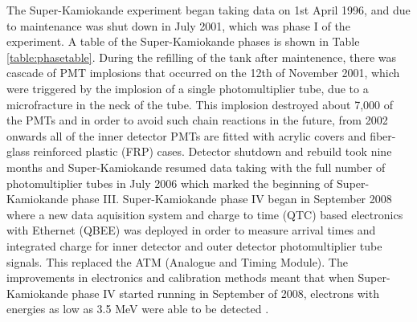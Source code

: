 The Super-Kamiokande experiment began taking data on 1st April 1996, and due to maintenance was shut down in July 2001, which was phase I of the experiment. A table of the Super-Kamiokande phases is shown in Table \ref{table:phasetable}. During the refilling of the tank after maintenence, there was cascade of PMT implosions that occurred on the 12th of November 2001, which were triggered by the implosion of a single photomultiplier tube, due to a microfracture in the neck of the tube. This implosion destroyed about 7,000 of the PMTs and in order to avoid such chain reactions in the future, from 2002 onwards all of the inner detector PMTs are fitted with acrylic covers and fiber-glass reinforced plastic (FRP) cases. Detector shutdown and rebuild took nine months and Super-Kamiokande resumed data taking with the full number of photomultiplier tubes in July 2006 which marked the beginning of Super-Kamiokande phase III. Super-Kamiokande phase IV began in September 2008 where a new data aquisition system and charge to time (QTC) based electronics with Ethernet (QBEE) was deployed in order to measure arrival times and integrated charge for inner detector and outer detector photomultiplier tube signals. This replaced the ATM (Analogue and Timing Module). The improvements in electronics and calibration methods meant that when Super-Kamiokande phase IV started running in September of 2008, electrons with energies as low as 3.5 MeV were able to be detected \cite{yamada2010commissioning}.

